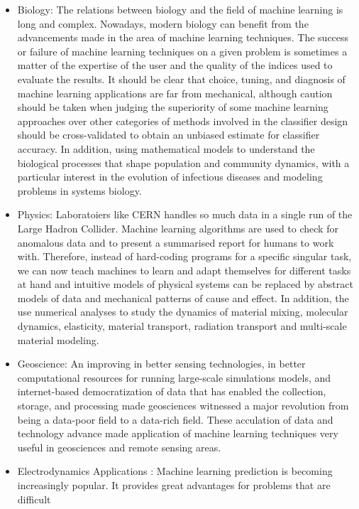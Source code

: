 \documentclass[a4paper, 11pt]{article}
\begin{document}
\begin{small}
\begin{itemize}\itemsep -2pt
\item Biology: The relations between biology and the field of machine learning is long and complex. Nowadays, modern biology can benefit from the advancements made in the area of machine learning techniques. 
The success or failure of machine learning techniques on a given problem is sometimes a matter of the expertise of the user and  the quality of the indices used to evaluate the results.
 It should be clear that choice, tuning, and diagnosis of machine learning applications are far from mechanical, although caution should be taken when judging the superiority of some machine learning approaches over other categories of methods
involved in the classifier design should be cross-validated to obtain an unbiased estimate for classifier accuracy.
In addition, using mathematical models to understand the biological processes that shape population and community dynamics, with a
particular interest in the evolution of infectious diseases and modeling problems in systems biology\cite{Tarca_2007_Machine_Learning_Biology}. 
\item Physics: Laboratoiers like CERN handles so much data in a single run of the Large Hadron Collider. Machine learning algorithms are used
to check for anomalous data and to present a summarised report for humans to work with. Therefore, instead of hard-coding programs for a specific singular task,
we can now teach machines to learn and adapt themselves for different tasks at hand and intuitive models of physical systems can be replaced by abstract models
of data and mechanical patterns of cause and effect. In addition, the use numerical analyses to study the dynamics of material mixing, molecular dynamics, elasticity,
material transport, radiation transport and multi-scale material modeling. 
\item Geoscience: An improving in better sensing technologies, in better computational resources for running large-scale simulations models,
and internet-based democratization of data that has enabled the collection, storage, and processing made geosciences witnessed a 
major revolution from being a data-poor field to a data-rich field. These acculation of data and technology advance made application of machine learning
techniques very useful in geosciences and remote sensing areas\cite{ML_Geoscience}.
\item Electrodynamics Applications : Machine learning prediction is becoming increasingly popular. It provides great advantages for problems that are difficult

\end{itemize}
\end{small}
\end{document}
